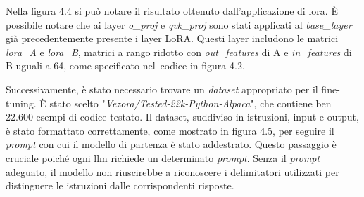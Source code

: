     Nella figura 4.4 si può notare il risultato ottenuto dall'applicazione di \gls{lora}. 
   È possibile notare che ai layer \textit{o\_proj} e \textit{qvk\_proj} sono stati applicati al \textit{base\_layer} già precedentemente presente i layer LoRA. Questi layer includono le matrici \textit{lora\_A} e \textit{lora\_B}, matrici a rango ridotto con \textit{out\_features} di A e \textit{in\_features} di B uguali a 64, come specificato nel\ codice in figura 4.2.
    
    Successivamente, è stato necessario trovare un \textit{dataset} appropriato per il \gls{fine-tuning}. È stato scelto "\textit{Vezora/Tested-22k-Python-Alpaca}", che contiene ben 22.600 esempi di codice testato. Il dataset, suddiviso in istruzioni, input e output, è stato formattato correttamente, come mostrato in figura 4.5, per seguire il \textit{prompt} con cui il modello di partenza è stato addestrato. Questo passaggio è cruciale poiché ogni \gls{llm} richiede un determinato \textit{prompt}. Senza il \textit{prompt} adeguato, il modello non riuscirebbe a riconoscere i delimitatori utilizzati per distinguere le istruzioni dalle corrispondenti risposte.

